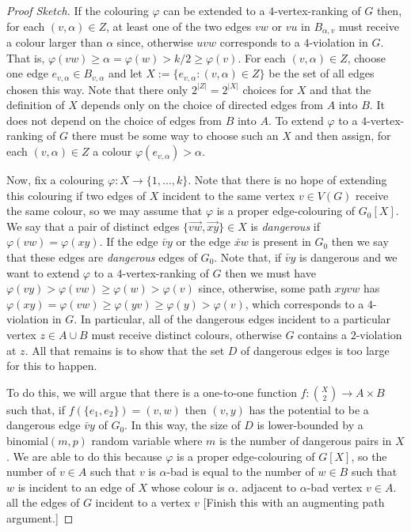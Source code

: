 \documentclass{patmorin}
\newcommand{\defin}[1]{\emph{\color{brightmaroon}#1}}
\begin{document}
\begin{proof}[Proof Sketch]
  If the colouring $\varphi$ can be extended to a $4$-vertex-ranking of $G$ then, for each $(v,\alpha)\in Z$, at least one of the two edges $vw$ or $vu$ in $B_{\alpha,v}$ must receive a colour larger than $\alpha$ since, otherwise $uvw$ corresponds to a $4$-violation in $G$. That is, $\varphi(vw)\ge \alpha=\varphi(w)> k/2\ge \varphi(v)$.  For each $(v,\alpha)\in Z$, choose one edge $e_{v,\alpha}\in B_{v,\alpha}$ and let $X:=\{e_{v,\alpha}:(v,\alpha)\in Z\}$ be the set of all edges chosen this way. Note that there only $2^{|Z|}=2^{|X|}$ choices for $X$ and that the definition of $X$ depends only on the choice of directed edges from $A$ into $B$.  It does not depend on the choice of edges from $B$ into $A$. To extend $\varphi$ to a $4$-vertex-ranking of $G$ there must be some way to choose such an $X$ and then assign, for each $(v,\alpha)\in Z$ a colour $\varphi(e_{v,\alpha})>\alpha$.

  Now, fix a colouring $\varphi:X\to\{1,\ldots,k\}$.  Note that there is no hope of extending this colouring if two edges of $X$ incident to the same vertex $v\in V(G)$ receive the same colour, so we may assume that $\varphi$ is a proper edge-colouring of $G_0[X]$.  We say that a pair of distinct edges $\{\overrightarrow{vw},\overrightarrow{xy}\}\in X$ is \defin{dangerous} if $\varphi(vw)=\varphi(xy)$.  If the edge  $\overleftarrow{vy}$ or the edge $\overleftarrow{xw}$ is present in $G_0$ then we say that these edges are \defin{dangerous} edges of $G_0$.  Note that, if $\overleftarrow{vy}$ is dangerous and we want to extend $\varphi$ to a $4$-vertex-ranking of $G$ then we must have $\varphi(vy)>\varphi(vw)\ge\varphi(w)>\varphi(v)$ since, otherwise, some path $xyvw$ has $\varphi(xy)=\varphi(vw)\ge \varphi(yv)\ge\varphi(y)>\varphi(v)$, which corresponds to a $4$-violation in $G$.  In particular, all of the dangerous edges incident to a particular vertex $z\in A\cup B$ must receive distinct colours, otherwise $G$ contains a $2$-violation at $z$.  All that remains is to show that the set $D$ of dangerous edges is too large for this to happen.

  To do this, we will argue that there is a one-to-one function $f:\binom{X}{2}\to A\times B$ such that, if $f(\{e_1,e_2\})=(v,w)$ then $(v,y)$ has the potential to be a dangerous edge $\overleftarrow{vy}$ of $G_0$.  In this way, the size of $D$ is lower-bounded by a binomial$(m,p)$ random variable where $m$ is the number of dangerous pairs in $X$. We are able to do this because $\varphi$ is a proper edge-colouring of $G[X]$, so the number of $v\in A$ such that $v$ is $\alpha$-bad is equal to the number of $w\in B$ such that $w$ is incident to an edge of $X$ whose colour is $\alpha$.  adjacent to $\alpha$-bad vertex $v\in A$.  all the edges of $G$ incident to a vertex $v$ [Finish this with an augmenting path argument.]


\end{proof}
\end{document}
